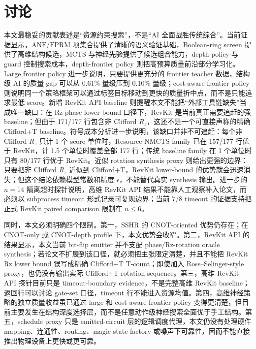 \documentclass[UTF8,fontset=macnew,11pt]{ctexart}
\newcommand{\screen}{Boolean-ring screen}
\newcommand{\anf}{\ensuremath{\mathrm{ANF}}}
\newcommand{\fprm}{\ensuremath{\mathrm{FPRM}}}
\newcommand{\mcts}{\ensuremath{\mathrm{MCTS}}}
\begin{document}
\section{讨论}

本文最稳妥的贡献表述是“资源约束搜索”，不是“AI 全面战胜传统综合”。当前证据显示，\anf{}/\fprm{} 项集合提供了清晰的语义验证基础，\screen{} 提供了高维结构候选，\mcts{} 与神经先验提供了候选组合能力，depth policy 与 guard 控制搜索成本，depth-frontier policy 则把高预算质量前沿部分学习化。Large frontier policy 进一步说明，只要提供更充分的 frontier teacher 数据，结构级 AI 的质量 gap 可以从 0.61\% 量级压到 0.10\% 量级；cost-aware frontier policy 则说明同一个策略框架可以通过标签目标移动到更快的质量折中点，而不是只能追求最低 score。新增 RevKit API baseline 则提醒本文不能把“外部工具链缺失”当成唯一缺口：在 Rz-phase lower-bound 口径下，RevKit 是当前真正需要追赶的强 baseline；但由于 171/177 行包含非 Clifford $R_z$，这还不是一个可直接声称的精确 Clifford+T baseline。符号成本分析进一步说明，该缺口并非不可追赶：每个非 Clifford $R_z$ 只计 1 个 score 单位时，Resource-NMCTS family 已在 157/177 行优于 RevKit，计 1.5 个单位时覆盖全部 177 行；传统 baseline family 在 1 个单位时只有 80/177 行优于 RevKit。近似 rotation synthesis proxy 则给出更强的边界：只要把非 Clifford $R_z$ 近似到 Clifford+T，RevKit lower-bound 的优势就会迅速消失；但这个结论依赖模型常数和精度 $\epsilon$，不能替代真实 synthesis 输出。进一步的 $n=14$ 隔离超时探针说明，高维 RevKit API 结果不能靠人工观察补入论文，而必须以 subprocess timeout 形式记录可复现边界；当前 7/8 timeout 的证据支持把正式 RevKit paired comparison 限制在 $n\leq6$。

同时，本文必须明确四个限制。第一，SSHR 的 CNOT-oriented 优势仍存在；在 CNOT-only 或 CNOT-depth profile 下，本文优势会收窄。第二，RevKit API 的结果显示，本文当前 bit-flip emitter 并不支配 phase/Rz-rotation oracle synthesis；若论文不扩展到该口径，就必须把主张限定清楚，并且不能把 RevKit Rz lower bound 误写成精确 Clifford+T T-count；即使加入 Ross--Selinger-style proxy，也仍没有输出实际 Clifford+T rotation sequence。第三，高维 RevKit API 探针目前只是 timeout-boundary evidence，不是完整高维 RevKit baseline；返回行可以讨论 gate-set 口径，timeout 行不能进入资源均值。第四，高维神经策略的独立质量收益虽已通过 large 和 cost-aware frontier policy 变得更清楚，但目前主要发生在结构深度选择层，而不是任意动作级神经搜索全面优于手工结构。第五，schedule proxy 只是 emitted-circuit 层的逻辑调度代理，本文仍没有处理硬件 mapping、连通性、routing、magic-state factory 或噪声下可靠性，因而不能直接推出物理设备上更快或更可靠。
\end{document}
